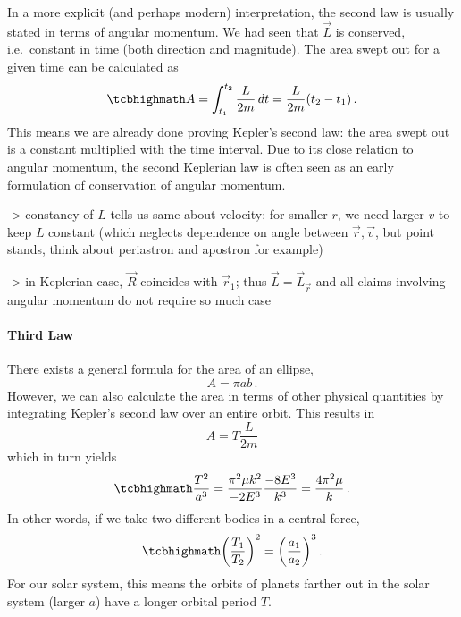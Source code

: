 \documentclass[../class_mech_main.tex]{subfiles}
\begin{document}
In a more explicit (and perhaps modern) interpretation, the second law is usually stated in terms of angular momentum. We had seen that $\vec{L}$ is conserved, i.e.~constant in time (both direction and magnitude). The area swept out for a given time can be calculated as
\begin{equation}
	\eqbox{
		A = \int_{t_1}^{t_2} \frac{L}{2m} \, dt = \frac{L}{2m} (t_2 - t_1)
	} \, .
\end{equation}
This means we are already done proving Kepler's second law: the area swept out is a constant multiplied with the time interval. Due to its close relation to angular momentum, the second Keplerian law is often seen as an early formulation of conservation of angular momentum.




-> constancy of $L$ tells us same about velocity: for smaller $r$, we need larger $v$ to keep $L$ constant (which neglects dependence on angle between $\vec{r}, \vec{v}$, but point stands, think about periastron and apostron for example)


-> in Keplerian case, $\vec{R}$ coincides with $\vec{r}_1$; thus $\vec{L} = \vec{L}_{\vec{r}}$ and all claims involving angular momentum do not require so much case 




			\paragraph{Third Law}
There exists a general formula for the area of an ellipse,
\begin{equation}
	A = \pi a b
	\, .
\end{equation}
However, we can also calculate the area in terms of other physical quantities by integrating Kepler's second law over an entire orbit. This results in
\begin{equation}
	A = T \frac{L}{2m}
\end{equation}
which in turn yields
\begin{equation}
	\eqbox{
		\frac{T^2}{a^3} = \frac{\pi^2 \mu k^2}{- 2 E^3} \frac{- 8 E^3}{k^3} = \frac{4\pi^2 \mu}{k}
	}
	\, .
\end{equation}
In other words, if we take two different bodies in a central force,
\begin{equation}
	\eqbox{
		\qty(\frac{T_1}{T_2})^2 = \qty(\frac{a_1}{a_2})^3
	} \, .
\end{equation}
For our solar system, this means the orbits of planets farther out in the solar system (larger $a$) have a longer orbital period $T$.
\end{document}
